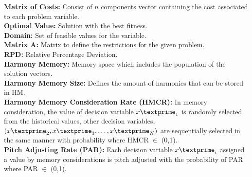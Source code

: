 \textbf{Matrix of Costs:} 
Consist of $n$ components vector containing the cost associated to each problem variable.\\

\textbf{Optimal Value:} 
Solution with the best fitness.\\

\textbf{Domain:} 
Set of feasible values for the variable.\\

\textbf{Matrix A:} 
Matrix to define the restrictions for the given problem.\\

\textbf{RPD:} 
Relative Percentage Deviation.\\

\textbf{Harmony Memory:} 
Memory space which includes the population of the solution vectors.\\

\textbf{Harmony Memory Size:} 
Defines the amount of harmonies that can be stored in HM.\\

\textbf{Harmony Memory Consideration Rate (HMCR):} 
In memory consideration, the value of decision variable ${x\textprime}_1$ is randomly selected from the historical values, other decision variables, $({x\textprime}_2, {x\textprime}_3,\dots,{x\textprime}_N)$ are sequentially selected in the same manner with probability where HMCR $\in$ (0,1).\\

\textbf{Pitch Adjusting Rate (PAR):} 
Each decision variable ${x\textprime}_i$ assigned a value by memory considerations is pitch adjusted with the probability of PAR where PAR $\in$ (0,1).\\

